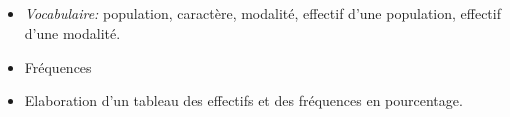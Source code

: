 \subsection*{}

\savoir
\begin{itemize}
\item \textit{Vocabulaire:} population, caractère, modalité, effectif d'une population, effectif d'une modalité.
\item Fréquences
\end{itemize}
\savoirfaire
\begin{itemize}
\item Elaboration d'un tableau des effectifs et des fréquences en pourcentage.
\end{itemize}